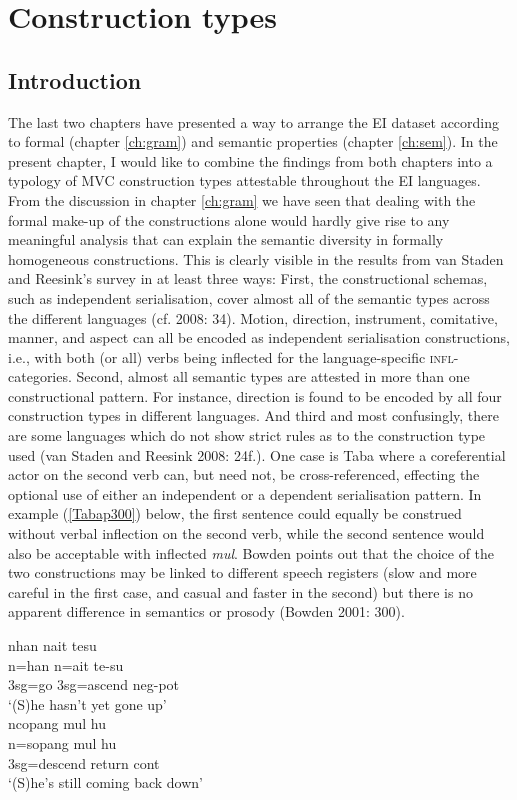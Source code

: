 \chapter{Construction types} \label{ch:constructions}
\section{Introduction}

The last two chapters have presented a way to arrange the EI dataset according to formal (chapter \ref{ch:gram}) and semantic properties (chapter \ref{ch:sem}). In the present chapter, I would like to combine the findings from both chapters into a typology of MVC construction types attestable throughout the EI languages. From the discussion in chapter \ref{ch:gram} we have seen that dealing with the formal make-up of the constructions alone would hardly give rise to any meaningful analysis that can explain the semantic diversity in formally homogeneous constructions. This is clearly visible in the results from van Staden and Reesink's survey in at least three ways: First, the constructional schemas, such as independent serialisation, cover almost all of the semantic types across the different languages (cf. 2008: 34). Motion, direction, instrument, comitative, manner, and aspect can all be encoded as independent serialisation constructions, i.e., with both (or all) verbs being inflected for the language-specific \textsc{infl}-categories. Second, almost all semantic types are attested in more than one constructional pattern. For instance, direction is found to be encoded by all four construction types in different languages. And third and most confusingly, there are some languages which do not show strict rules as to the construction type used (van Staden and Reesink 2008: 24f.). One case is Taba where a coreferential actor on the second verb can, but need not, be cross-referenced, effecting the optional use of either an independent  or a dependent serialisation pattern. In example (\ref{Tabap300}) below, the first sentence could equally be construed without verbal inflection on the second verb, while the second sentence would also be acceptable with inflected \textit{mul}. Bowden points out that the choice of the two constructions may be linked to different speech registers (slow and more careful in the first case, and casual and faster in the second) but there is no apparent difference in semantics or prosody (Bowden 2001: 300).

\pex \label{Tabap300}
\a
\gll nhan nait tesu \\
n=han n=ait te-su \\
\glc \acs{3}\acs{sg}=go \acs{3}\acs{sg}=ascend \acs{neg}-\acs{pot} \\
\glft `(S)he hasn't yet gone up' \\ 
\z
\a
\gll ncopang mul hu \\ 
n=sopang mul hu \\
\glc \acs{3}\acs{sg}=descend return \acs{cont} \\
\glft `(S)he's still coming back down' \\ 
\z
\xe

